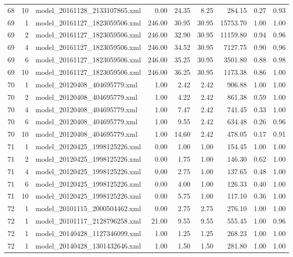 \begin{table}[ht]
\begin{tabular}{rrlrrrrrr}
   68 &  10 & model\_20161128\_2133107865.xml & 0.00 & 24.35 & 8.25 & 284.15 & 0.27 & 0.93 \\ 
   69 &   1 & model\_20161127\_1823059506.xml & 246.00 & 30.95 & 30.95 & 15753.70 & 1.00 & 1.00 \\ 
   69 &   2 & model\_20161127\_1823059506.xml & 246.00 & 32.90 & 30.95 & 11159.80 & 0.94 & 0.96 \\ 
   69 &   4 & model\_20161127\_1823059506.xml & 246.00 & 34.52 & 30.95 & 7127.75 & 0.90 & 0.96 \\ 
   69 &   6 & model\_20161127\_1823059506.xml & 246.00 & 35.25 & 30.95 & 3501.80 & 0.88 & 0.98 \\ 
   69 &  10 & model\_20161127\_1823059506.xml & 246.00 & 36.25 & 30.95 & 1173.38 & 0.86 & 1.00 \\ 
   70 &   1 & model\_20120408\_404695779.xml & 1.00 & 2.42 & 2.42 & 906.88 & 1.00 & 1.00 \\ 
   70 &   2 & model\_20120408\_404695779.xml & 1.00 & 4.22 & 2.42 & 861.38 & 0.59 & 1.00 \\ 
   70 &   4 & model\_20120408\_404695779.xml & 1.00 & 7.47 & 2.42 & 741.45 & 0.33 & 1.00 \\ 
   70 &   6 & model\_20120408\_404695779.xml & 1.00 & 9.55 & 2.42 & 634.48 & 0.26 & 0.96 \\ 
   70 &  10 & model\_20120408\_404695779.xml & 1.00 & 14.60 & 2.42 & 478.05 & 0.17 & 0.91 \\ 
   71 &   1 & model\_20120425\_1998125226.xml & 0.00 & 1.00 & 1.00 & 154.45 & 1.00 & 1.00 \\ 
   71 &   2 & model\_20120425\_1998125226.xml & 0.00 & 1.75 & 1.00 & 146.30 & 0.62 & 1.00 \\ 
   71 &   4 & model\_20120425\_1998125226.xml & 0.00 & 2.75 & 1.00 & 137.65 & 0.48 & 1.00 \\ 
   71 &   6 & model\_20120425\_1998125226.xml & 0.00 & 4.00 & 1.00 & 126.33 & 0.40 & 1.00 \\ 
   71 &  10 & model\_20120425\_1998125226.xml & 0.00 & 5.75 & 1.00 & 117.10 & 0.36 & 1.00 \\ 
   72 &   1 & model\_20101115\_2000504462.xml & 0.00 & 2.75 & 2.75 & 276.10 & 1.00 & 1.00 \\ 
   72 &   1 & model\_20101117\_2128796258.xml & 21.00 & 9.55 & 9.55 & 555.45 & 1.00 & 0.96 \\ 
   72 &   1 & model\_20140428\_1127346099.xml & 1.00 & 1.25 & 1.25 & 268.23 & 1.00 & 1.00 \\ 
   72 &   1 & model\_20140428\_1301432646.xml & 1.00 & 1.50 & 1.50 & 281.80 & 1.00 & 1.00 \\ 

\end{tabular}
\end{table}
